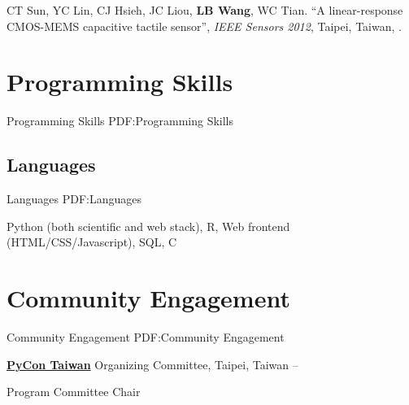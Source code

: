 \documentclass[a4paper,12pt,oneside]{article}
\begin{document}
\begin{body}
\begin{publication}[widest*=100]
    \item
        CT Sun, YC Lin, CJ Hsieh, JC Liou, \textbf{LB Wang}, WC Tian.
        ``A linear-response CMOS-MEMS capacitive tactile sensor'',
        \textit{IEEE Sensors 2012},
        Taipei, Taiwan,
        .

\end{publication}



\section{Programming Skills}
{Programming Skills}
{PDF:Programming Skills}

\subsection{Languages}
{Languages}
{PDF:Languages}

Python (both scientific and web stack),
R,
Web frontend (HTML/CSS/Javascript),
SQL,
C

%


\section{Community Engagement}
{Community Engagement}
{PDF:Community Engagement}

\href{http://pycon.tw}{\textbf{PyCon Taiwan}} Organizing Committee, Taipei, Taiwan
\hfill
{} --
\par
Program Committee Chair


\end{body}
\end{document}
